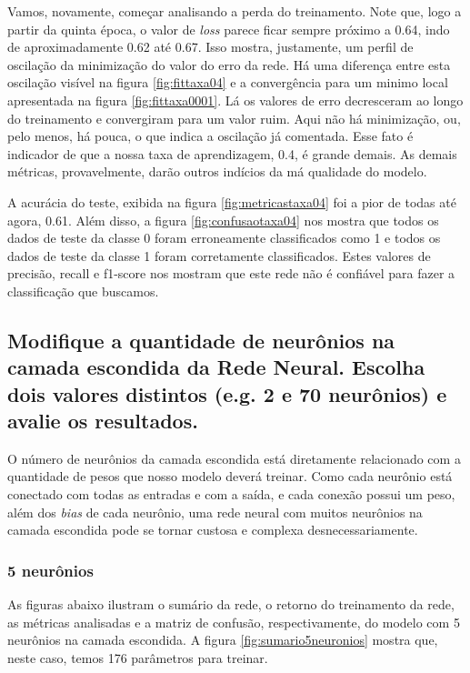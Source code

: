 \documentclass[12pt]{article}
\begin{document}
Vamos, novamente, começar analisando a perda do treinamento. Note que, logo a partir da quinta época, o valor de \textit{loss} parece ficar sempre próximo a 0.64, indo de aproximadamente 0.62 até 0.67. Isso mostra, justamente, um perfil de oscilação da minimização do valor do erro da rede. Há uma diferença entre esta oscilação visível na figura \ref{fig:fittaxa04} e a convergência para um minimo local apresentada na figura \ref{fig:fittaxa0001}. Lá os valores de erro decresceram ao longo do treinamento e convergiram para um valor ruim. Aqui não há minimização, ou, pelo menos, há pouca, o que indica a oscilação já comentada. Esse fato é indicador de que a nossa taxa de aprendizagem, 0.4, é grande demais. As demais métricas, provavelmente, darão outros indícios da má qualidade do modelo.

A acurácia do teste, exibida na figura \ref{fig:metricastaxa04} foi a pior de todas até agora, 0.61. Além disso, a figura \ref{fig:confusaotaxa04} nos mostra que todos os dados de teste da classe 0 foram erroneamente classificados como 1 e todos os dados de teste da classe 1 foram corretamente classificados. Estes valores de precisão, recall e f1-score nos mostram que este rede não é confiável para fazer a classificação que buscamos. 

\subsection{Modifique a quantidade de neurônios na camada escondida da Rede Neural. Escolha dois valores distintos (e.g. 2 e 70 neurônios) e avalie os	resultados.}

O número de neurônios da camada escondida está diretamente relacionado com a quantidade de pesos que nosso modelo deverá treinar. Como cada neurônio está conectado com todas as entradas e com a saída, e cada conexão possui um peso, além dos \textit{bias} de cada neurônio, uma rede neural com muitos neurônios na camada escondida pode se tornar custosa e complexa desnecessariamente.

\subsubsection{5 neurônios}

As figuras abaixo ilustram o sumário da rede, o retorno do treinamento da rede, as métricas analisadas e a matriz de confusão, respectivamente, do modelo com 5 neurônios na camada escondida. A figura \ref{fig:sumario5neuronios} mostra que, neste caso, temos 176 parâmetros para treinar.
\end{document}
